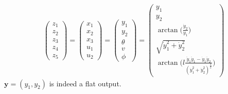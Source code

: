 \documentclass[a4paper,11pt,headings=standardclasses]{scrartcl}%
\newcommand{\y}{\mathbf{y}}
\begin{document}
\begin{align}
\begin{pmatrix} z_1 \\ z_2 \\ z_3 \\ z_4 \\ z_5 \end{pmatrix} = 
\begin{pmatrix} x_1 \\ x_2 \\ x_3 \\ u_1 \\ u_2 \end{pmatrix} = 
\begin{pmatrix} y_1 \\ y_2 \\ \theta \\v \\  \phi \end{pmatrix} =
\begin{pmatrix} y_1 \\ y_2 \\  \arctan\Big(\frac{\dot{y}_2}{\dot{y}_1}\Big)\\ \sqrt{\dot{y}_1^2+\dot{y}_2^2}\\ \arctan\Big(l \frac{\ddot{y}_1 \ddot{y}_1 - \dot{y}_1 \ddot{y}_2}{(\dot{y}_1^2+\dot{y}_2^2)^{\frac{3}{2}}} \Big) \end{pmatrix}
\end{align}
$\y = (y_1, y_2)$ is indeed a flat output.
\end{document}
